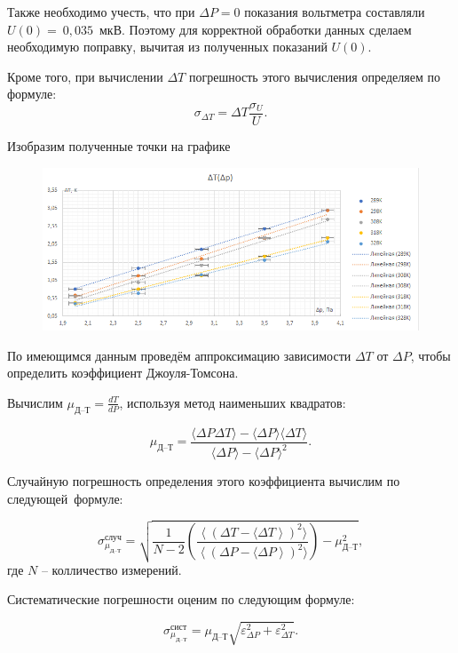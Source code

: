 \documentclass[12pt,a4paper]{article}
\begin{document}
Также необходимо учесть, что при $ \Delta P = 0$ показания вольтметра составляли $ U(0) =~0,035 $~мкВ. Поэтому для корректной обработки данных сделаем необходимую поправку, вычитая из полученных показаний $ U(0) $.

Кроме того, при вычислении $ \Delta T $ погрешность этого вычисления определяем по формуле: \[ \sigma_{\Delta T} = \Delta T \frac{\sigma_U}{U}. \]

Изобразим полученные точки на графике

\begin{figure}[H]
	\begin{center}
		\includegraphics[width=18cm]{2.1.6_gr_1}
	\end{center}
\end{figure}


По имеющимся данным проведём аппроксимацию зависимости $ \Delta T $ от $ \Delta P $, чтобы определить коэффициент Джоуля-Томсона. 

Вычислим $ \mu_\text{Д--Т} = \frac{dT}{dP} $, используя метод наименьших квадратов:

\[ \mu_\text{Д--Т} = \frac{\langle \Delta P \Delta T \rangle - \langle \Delta P \rangle \langle \Delta T \rangle}{\langle \Delta P \rangle - \langle \Delta P \rangle ^2}.\]

Случайную погрешность определения этого коэффициента вычислим по следующей~формуле:

\[ \sigma^\text{случ}_{\mu_\text{Д--Т}} = \sqrt{\frac{1}{N-2} \left(\frac{\left\langle\left(\Delta T - \langle \Delta T\right\rangle\right)^2 \rangle}{\left\langle\left(\Delta P - \langle \Delta P\right\rangle\right)^2 \rangle}\right)-\mu_\text{Д--Т}^2},\] где  $ N $  -- колличество измерений.



Систематические погрешности оценим по следующим формуле:

\[ \sigma^\text{сист}_{\mu_\text{Д--Т}} = {\mu_\text{Д--Т}}\sqrt{\varepsilon^2_{\Delta P}+\varepsilon^2_{\Delta T}}.\]
\end{document}
